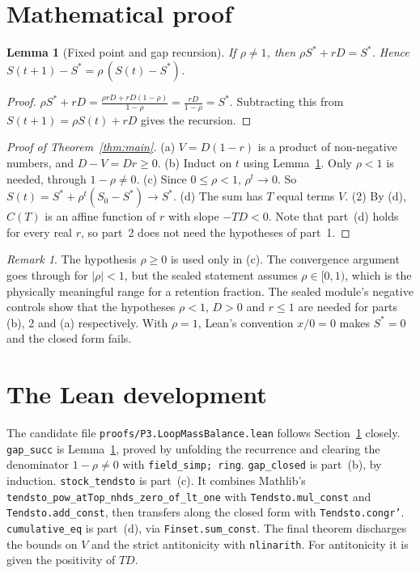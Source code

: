 \documentclass[11pt]{article}
\newtheorem{lemma}[theorem]{Lemma}
\theoremstyle{definition}
\theoremstyle{remark}
\newtheorem*{remark}{Remark}
\begin{document}
\section{Mathematical proof}
\label{sec:math}
\begin{lemma}[Fixed point and gap recursion]\label{lem:gap}
If $\rho\ne1$, then $\rho S^\ast+rD=S^\ast$. Hence $S(t+1)-S^\ast=\rho\,(S(t)-S^\ast)$.
\end{lemma}
\begin{proof}
$\rho S^\ast+rD = \frac{\rho rD + rD(1-\rho)}{1-\rho}=\frac{rD}{1-\rho}=S^\ast$. Subtracting
this from $S(t+1)=\rho S(t)+rD$ gives the recursion.
\end{proof}

\begin{proof}[Proof of Theorem~\ref{thm:main}]
(a) $V=D(1-r)$ is a product of non-negative numbers, and $D-V=Dr\ge0$.
(b) Induct on $t$ using Lemma~\ref{lem:gap}. Only $\rho<1$ is needed, through $1-\rho\ne0$.
(c) Since $0\le\rho<1$, $\rho^t\to0$. So $S(t)=S^\ast+\rho^t(S_0-S^\ast)\to S^\ast$.
(d) The sum has $T$ equal terms $V$.
(2) By (d), $C(T)$ is an affine function of $r$ with slope $-TD<0$. Note that part~(d) holds for
every real $r$, so part~2 does not need the hypotheses of part~1.
\end{proof}

\begin{remark}
The hypothesis $\rho\ge0$ is used only in (c). The convergence argument goes through for
$|\rho|<1$, but the sealed statement assumes $\rho\in[0,1)$, which is the physically meaningful
range for a retention fraction. The sealed module's negative controls show that the hypotheses
$\rho<1$, $D>0$ and $r\le1$ are needed for parts (b), 2 and (a) respectively. With $\rho=1$,
Lean's convention $x/0=0$ makes $S^\ast=0$ and the closed form fails.
\end{remark}

\section{The Lean development}
\label{sec:proof}
The candidate file \texttt{proofs/P3.LoopMassBalance.lean} follows Section~\ref{sec:math}
closely. \texttt{gap\_succ} is Lemma~\ref{lem:gap}, proved by unfolding the recurrence and
clearing the denominator $1-\rho\ne0$ with \texttt{field\_simp; ring}. \texttt{gap\_closed} is
part~(b), by induction. \texttt{stock\_tendsto} is part~(c). It combines Mathlib's
\texttt{tendsto\_pow\_atTop\_nhds\_zero\_of\_lt\_one} with \texttt{Tendsto.mul\_const} and
\texttt{Tendsto.add\_const}, then transfers along the closed form with \texttt{Tendsto.congr'}.
\texttt{cumulative\_eq} is part~(d), via \texttt{Finset.sum\_const}. The final theorem
discharges the bounds on $V$ and the strict antitonicity with \texttt{nlinarith}. For
antitonicity it is given the positivity of $TD$.
\end{document}
